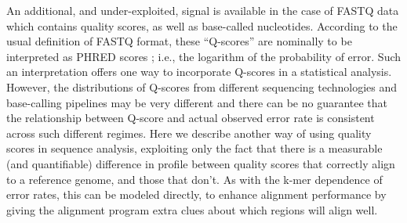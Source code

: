 \documentclass{bioinfo}
\begin{document}
An additional, and under-exploited, signal is available in the case of FASTQ data which contains quality scores, as well as base-called nucleotides. According to the usual definition of FASTQ format, these ``Q-scores'' are nominally to be interpreted as PHRED scores \citep{Cock2010-bk}; i.e., the logarithm of the probability of error. Such an interpretation offers one way to incorporate Q-scores in a statistical analysis.  However, the distributions of Q-scores from different sequencing technologies and base-calling pipelines may be very different \citep{Utturkar2015-vh} and there can be no guarantee that the relationship between Q-score and actual observed error rate is consistent across such different regimes. Here we describe another way of using quality scores in sequence analysis, exploiting only the fact that there is a measurable (and quantifiable) difference in profile between quality scores that correctly align to a reference genome, and those that don't. As with the k-mer dependence of error rates, this can be modeled directly, to enhance alignment performance by giving the alignment program extra clues about which regions will align well.
\end{document}
